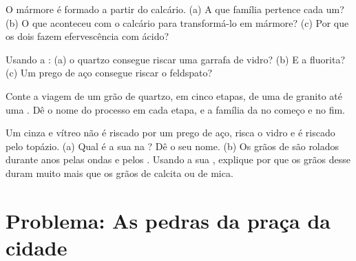 \begin{exercise}[$\star\star$]\label{exo:g6:rocks-and-minerals:9}
O mármore é formado a partir do calcário. (a) A que família pertence cada
um? (b) O que aconteceu com o calcário para transformá-lo em mármore?
(c) Por que os dois fazem efervescência com ácido?
\end{exercise}

\begin{exercise}[$\star\star$]\label{exo:g6:rocks-and-minerals:10}
Usando a : (a) o quartzo consegue riscar uma garrafa de
vidro? (b) E a fluorita? (c) Um prego de aço consegue riscar o feldspato?
\end{exercise}

\begin{exercise}[$\star\star\star$]\label{exo:g6:rocks-and-minerals:11}
Conte a viagem de um grão de quartzo, em cinco etapas, de uma  de
granito até uma . Dê o nome do processo em cada etapa, e a
família da  no começo e no fim.
\end{exercise}

\begin{exercise}[$\star\star\star$]\label{exo:g6:rocks-and-minerals:12}
Um  cinza e vítreo não é riscado por um prego de aço, risca o vidro
e é riscado pelo topázio. (a) Qual é a sua  na ? Dê o
seu nome. (b) Os grãos de  são rolados durante anos pelas ondas e
pelos . Usando a sua , explique por que os grãos desse 
duram muito mais que os grãos de calcita ou de mica.
\end{exercise}

\section{Problema: As pedras da praça da cidade}

